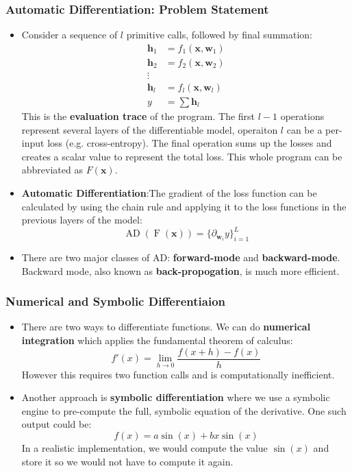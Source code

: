 \documentclass{article}
\newcommand{\tbf}[1]{\textbf{#1}}
\newcommand{\mbf}[1]{\mathbf{#1}}
\begin{document}
        \subsubsection{Automatic Differentiation: Problem Statement}
        \begin{itemize}
            \item Consider a sequence of $l$ primitive calls, followed by final summation:
            \begin{align*}
                \mbf{h}_1 &= f_1(\mbf{x}, \mbf{w}_1) \\
                \mbf{h}_2 &= f_2(\mbf{x}, \mbf{w}_2) \\
                \vdots \\
                \mbf{h}_l &= f_l(\mbf{x}, \mbf{w}_l) \\
                y &= \sum \mbf{h}_l
            \end{align*}
            This is the \tbf{evaluation trace} of the program. The first $l - 1$ operations represent several layers of the differentiable model, operaiton $l$ can be a per-input loss (e.g. cross-entropy).
            The final operation sums up the losses and creates a scalar value to represent the total loss. This whole program can be abbreviated as $F(\mbf{x})$.
            \item \tbf{Automatic Differentiation}:The gradient of the loss function can be calculated by using the chain rule and applying it to the loss functions in the previous layers of the model:
            \[\operatorname{AD}(\operatorname{F}(\mbf{x})) = \{ \partial_{\mbf{w}_i}y \} ^L_{i = 1}\]
            \item There are two major classes of AD: \tbf{forward-mode} and \tbf{backward-mode}. Backward mode, also known as \tbf{back-propogation}, is much more efficient. 
        \end{itemize}
        \subsubsection{Numerical and Symbolic Differentiaion}
        \begin{itemize}
            \item There are two ways to differentiate functions. We can do \tbf{numerical integration} which applies the fundamental theorem of calculus:
            \[f'(x) = \lim_{h \rightarrow 0} \frac{f(x+h) - f(x)}{h}\]
            However this requires two function calls and is computationally inefficient.
            \item Another approach is \tbf{symbolic differentiation} where we use a symbolic engine to pre-compute the full, symbolic equation of the derivative. One such output could be:
            \[f(x) = a\operatorname{sin}(x) + bx \operatorname{sin}(x)\]
            In a realistic implementation, we would compute the value $\operatorname{sin}(x)$ and store it so we would not have to compute it again.
        \end{itemize}
\end{document}
